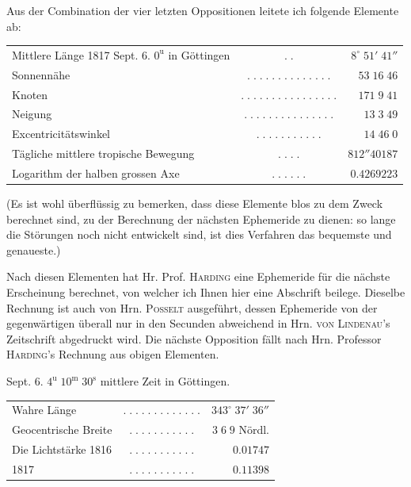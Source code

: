 \par\indent Aus der Combination der vier letzten Oppositionen leitete ich folgende Elemente ab:
\begin{center}\fontsize{9}{11}\selectfont\setlength{\tabcolsep}{2pt}\renewcommand{\arraystretch}{1.15}\begin{tabular}{lcr}
Mittlere Länge 1817 Sept. 6. $0^{\mathrm u}$ in Göttingen & $.\;.$ & $8^\circ\;51'\;41''$\\
Sonnennähe & $.\;.\;.\;.\;.\;.\;.\;.\;.\;.\;.\;.\;.\;.$ & $53\;16\;46$\\
Knoten & $.\;.\;.\;.\;.\;.\;.\;.\;.\;.\;.\;.\;.\;.\;.\;.$ & $171\;9\;41$\\
Neigung & $.\;.\;.\;.\;.\;.\;.\;.\;.\;.\;.\;.\;.\;.\;.$ & $13\;3\;49$\\
Excentricitätswinkel & $.\;.\;.\;.\;.\;.\;.\;.\;.\;.\;.$ & $14\;46\;0$\\
Tägliche mittlere tropische Bewegung & $.\;.\;.\;.$ & $812''40187$\\
Logarithm der halben grossen Axe & $.\;.\;.\;.\;.\;.$ & $0.4269223$\\
\end{tabular}\end{center}

\par\indent (Es ist wohl überflüssig zu bemerken, dass diese Elemente blos zu dem Zweck berechnet sind, zu der Berechnung der nächsten Ephemeride zu dienen: so lange die Störungen noch nicht entwickelt sind, ist dies Verfahren das bequemste und genaueste.)
\par\indent Nach diesen Elementen hat Hr. Prof. \textsc{Harding} eine Ephemeride für die nächste Erscheinung berechnet, von welcher ich Ihnen hier eine Abschrift beilege. Dieselbe Rechnung ist auch von Hrn. \textsc{Posselt} ausgeführt, dessen Ephemeride von der gegenwärtigen überall nur in den Secunden abweichend in Hrn. \textsc{von Lindenau}'s Zeitschrift abgedruckt wird. Die nächste Opposition fällt nach Hrn. Professor \textsc{Harding}'s Rechnung aus obigen Elementen.
\begin{center}\fontsize{10}{12} Sept. 6. $4^{\mathrm u}\;10^{\mathrm m}\;30^{\mathrm s}$ mittlere Zeit in Göttingen.\par
\setlength{\tabcolsep}{3pt}\begin{tabular}{lcr}
Wahre Länge & $.\;.\;.\;.\;.\;.\;.\;.\;.\;.\;.\;.\;.$ & $343^\circ\;37'\;36''$\\
Geocentrische Breite & $.\;.\;.\;.\;.\;.\;.\;.\;.\;.\;.$ & $3\;6\;9$ Nördl.\\
Die Lichtstärke 1816 & $.\;.\;.\;.\;.\;.\;.\;.\;.\;.\;.$ & $0.01747$\\
\hfill1817 & $.\;.\;.\;.\;.\;.\;.\;.\;.\;.\;.$ & $0.11398$\\
\end{tabular}\end{center}

